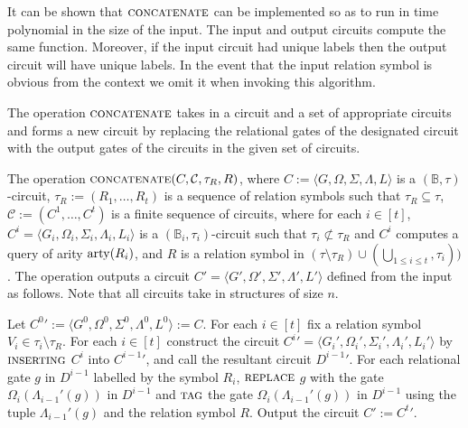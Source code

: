 \documentclass[../paper.tex]{subfiles}
\begin{document}



It can be shown that ${\normalfont\textsc{concatenate}}$ can be implemented so as to run in time
polynomial in the size of the input. The input and output circuits compute the
same function. Moreover, if the input circuit had unique labels then the output
circuit will have unique labels. In the event that the input relation symbol is
obvious from the context we omit it when invoking this algorithm.

The operation ${\normalfont\textsc{concatenate}}$ takes in a circuit and a set of appropriate
circuits and forms a new circuit by replacing the relational gates of the
designated circuit with the output gates of the circuits in the given set of
circuits.

\begin{definition}
  The operation ${\normalfont\textsc{concatenate}}(C, \mathcal{C}, \tau_R, R)$, where $C :=
  \langle G, \Omega, \Sigma, \Lambda, L \rangle$ is a $(\mathbb{B},
  \tau)$-circuit, $\tau_R := (R_1, \ldots, R_t)$ is a sequence of relation
  symbols such that $\tau_R \subseteq \tau$, $\mathcal{C} := ( C^1, \ldots,
  C^t)$ is a finite sequence of circuits, where for each $i \in [t]$, $C^i =
  \langle G_i, \Omega_i, \Sigma_i, \Lambda_i, L_i \rangle$ is a $(\mathbb{B}_i,
  \tau_i)$-circuit such that $\tau_i \not\subset \tau_R$ and $C^i$ computes a
  query of arity $\mathrm{arty}(R_i)$, and $R$ is a relation symbol in $(\tau \setminus
  \tau_R) \cup (\bigcup_{1 \leq i \leq t},\tau_i))$. The operation outputs a
  circuit $C' = \langle G', \Omega', \Sigma', \Lambda', L' \rangle$ defined from
  the input as follows. Note that all circuits take in structures of size $n$.
  
  Let ${C^0}' := \langle G^0, \Omega^0, \Sigma^0, \Lambda^0, L^0 \rangle := C$.
  For each $i \in [t]$ fix a relation symbol $V_i \in \tau_i \setminus \tau_R$.
  For each $i \in [t]$ construct the circuit ${C^{i}}' = \langle G_i',
  \Omega_i', \Sigma_i', \Lambda_i', L_i' \rangle $ by ${\normalfont\textsc{inserting}}$ $C^i$
  into ${C^{i-1}}'$, and call the resultant circuit ${D^{i-1}}'$. For each
  relational gate $g$ in $D^{i-1}$ labelled by the symbol $R_i$, ${\normalfont\textsc{replace}}$
  $g$ with the gate $\Omega_{i}(\Lambda_{i-1}'(g))$ in $D^{i-1}$ and ${\normalfont\textsc{tag}}$
  the gate $\Omega_i(\Lambda_{i-1}'(g))$ in $D^{i-1}$ using the tuple
  $\Lambda_{i-1}'(g)$ and the relation symbol $R$. Output the circuit $C' :=
  {C^t}'$.
\end{definition}
\end{document}
